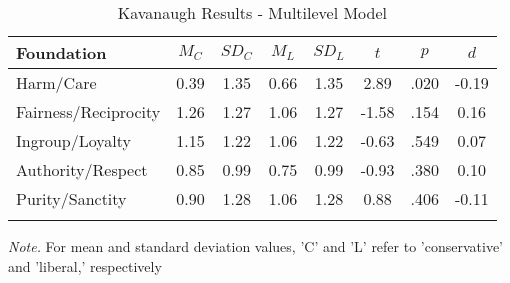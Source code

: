 \documentclass[
  english,
  man]{apa6}
\begin{document}
\begin{table}[tbp]

\begin{center}
\begin{threeparttable}

\caption{\label{tab:exp2-tablekav}Kavanaugh Results - Multilevel Model}

\footnotesize{

\begin{tabular}{lccccccc}
\toprule
Foundation & $M_C$ & $SD_C$ & $M_L$ & $SD_L$ & $t$ & $p$ & $d$\\
\midrule
Harm/Care & 0.39 & 1.35 & 0.66 & 1.35 & 2.89 & .020 & -0.19\\
Fairness/Reciprocity & 1.26 & 1.27 & 1.06 & 1.27 & -1.58 & .154 & 0.16\\
Ingroup/Loyalty & 1.15 & 1.22 & 1.06 & 1.22 & -0.63 & .549 & 0.07\\
Authority/Respect & 0.85 & 0.99 & 0.75 & 0.99 & -0.93 & .380 & 0.10\\
Purity/Sanctity & 0.90 & 1.28 & 1.06 & 1.28 & 0.88 & .406 & -0.11\\
\bottomrule
\addlinespace
\end{tabular}

}

\begin{tablenotes}[para]
\normalsize{\textit{Note.} For mean and standard deviation values, 'C' and 'L' refer to 'conservative' and 'liberal,' respectively}
\end{tablenotes}

\end{threeparttable}
\end{center}

\end{table}
\end{document}
